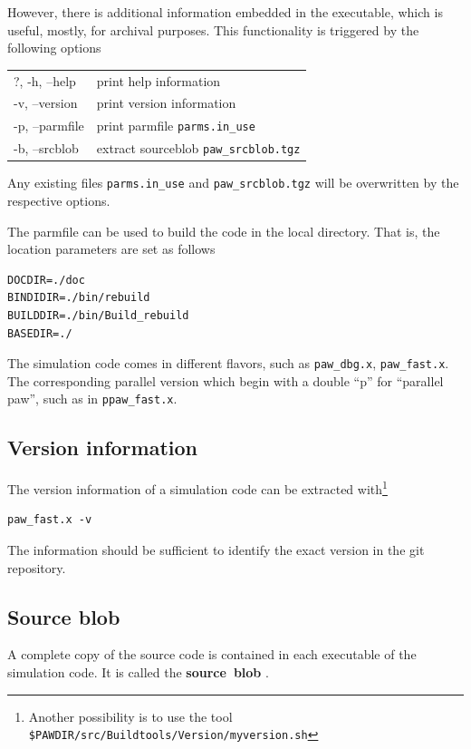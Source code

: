 \documentclass[final,12pt,makeidx,DIV=calc]{article}
\begin{document}
{{{{{{However, there is additional information embedded in the executable,
which is useful, mostly, for archival purposes. This functionality is
triggered by the following options
\begin{center}
\begin{tabular}{ll}
?, -h, --help & print help information\\
-v, --version & print version information\\
-p, --parmfile & print parmfile \verb|parms.in_use|\\
-b, --srcblob  & extract sourceblob \verb|paw_srcblob.tgz| \\
\end{tabular}
\end{center}
Any existing files \verb|parms.in_use| and \verb|paw_srcblob.tgz| will
be overwritten by the respective options.

The parmfile can be used to build the code in the local
directory. That is, the location  parameters are set as follows
\begin{verbatim}
DOCDIR=./doc
BINDIDIR=./bin/rebuild
BUILDDIR=./bin/Build_rebuild
BASEDIR=./
\end{verbatim}


The simulation code comes in different flavors, such as
\verb|paw_dbg.x|, \verb|paw_fast.x|. The corresponding parallel
version which begin with a double ``p'' for ``parallel paw'', such as
in \verb|ppaw_fast.x|.



\subsection{Version information}
The version information of a simulation code can be extracted
with\footnote{Another possibility is to use the tool
\texttt{\${PAWDIR}/src/Buildtools/Version/myversion.sh}}
\begin{verbatim}
paw_fast.x -v
\end{verbatim}
The information should be sufficient to identify the exact version in
the git repository.


\subsection{Source blob}
A complete copy of the source code is contained in each executable of
the simulation code. It is called the \textbf{source~blob}
.

}}}}}}
\end{document}
